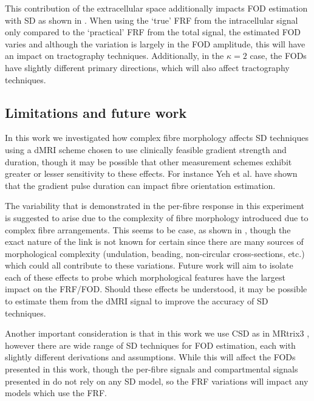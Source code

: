 This contribution of the extracellular space additionally impacts \ac{FOD} estimation with \acl{SD} as shown in .
When using the `true' \ac{FRF} from the intracellular signal only compared to the `practical' \ac{FRF} from the total signal, the estimated \ac{FOD} varies and although the variation is largely in the \ac{FOD} amplitude, this will have an impact on tractography techniques. Additionally, in the $\kappa=2$ case, the \ac{FOD}s have slightly different primary directions, which will also affect tractography techniques.

\subsection{Limitations and future work }
\label{sec:frf_limitations}
In this work we investigated how complex fibre morphology affects \acl{SD} techniques using a \ac{dMRI} scheme chosen to use clinically feasible gradient strength and duration, though it may be possible that other measurement schemes exhibit greater or lesser sensitivity to these effects. For instance Yeh et al. \cite{Yeh2010} have shown that the gradient pulse duration can impact fibre orientation estimation.

The variability that is demonstrated in the per-fibre response in this experiment is suggested to arise due to the complexity of fibre morphology introduced due to complex fibre arrangements.
This seems to be case, as shown in , though the exact nature of the link is not known for certain since there are many sources of morphological complexity (undulation, beading, non-circular cross-sections, etc.) which could all contribute to these variations.
Future work will aim to isolate each of these effects to probe which morphological features have the largest impact on the \ac{FRF}/\ac{FOD}. Should these effects be understood, it may be possible to estimate them from the \ac{dMRI} signal to improve the accuracy of \ac{SD} techniques.

Another important consideration is that in this work we use \acl{CSD} as in MRtrix3 \cite{Tournier2019}, however there are wide range of \ac{SD} techniques for \ac{FOD} estimation, each with slightly different derivations and assumptions.
While this will affect the \acp{FOD} presented in this work, though the per-fibre signals and compartmental signals presented in  do not rely on any \ac{SD} model, so the \ac{FRF} variations will impact any models which use the \ac{FRF}.

